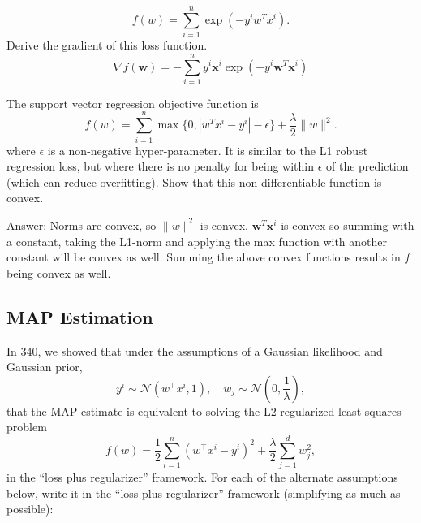 \documentclass{article}
\def\ans#1{\par\gre{Answer: #1}}
\def\blu#1{{\color{blu}#1}}
\def\gre#1{{\color{gre}#1}}
\def\norm#1{\|#1\|}
\begin{document}
{\[
f(w) = \sum_{i=1}^n \exp(-y^iw^Tx^i).
\]
\blu{Derive the gradient of this loss function.}
\\
\[\nabla f(\mathbf{w}) = -\sum_{i=1}^{n} y^i \mathbf{x}^i \exp{(-y^i \mathbf{w}^T \mathbf{x}^i)}\]
\item The support vector regression objective function is
\[
f(w) = \sum_{i=1}^n \max\{0, |w^Tx^i - y^i|-\epsilon\} + \frac \lambda 2 \norm{w}^2.
\]
where $\epsilon$ is a non-negative hyper-parameter. It is similar to the L1 robust regression loss, but where there is no penalty for being within $\epsilon$ of the prediction (which can reduce overfitting).\blu{ Show that this non-differentiable function is convex}.
\ans{
Norms are convex, so $\norm{w}^2$ is convex. 
$\mathbf{w}^T \mathbf{x}^i$ is convex so summing with a constant, taking the L1-norm and applying the max function with another constant will be convex as well.
Summing the above convex functions results in $f$ being convex as well.
}
}
\pagebreak



\subsection{MAP Estimation}


In 340, we showed that under the assumptions of a Gaussian likelihood and Gaussian prior,
\[
y^i \sim \mathcal{N}(w^\top x^i,1), \quad w_j \sim \mathcal{N}\left(0,\frac{1}{\lambda}\right),
\]
that the MAP estimate is equivalent to solving the L2-regularized least squares problem
\[
f(w) = \frac{1}{2}\sum_{i=1}^n (w^\top x^i - y^i)^2 + \frac \lambda 2 \sum_{j=1}^d w_j^2,
\]
in the ``loss plus regularizer'' framework.
For each of the alternate assumptions below, write it in the ``loss plus regularizer'' framework (simplifying as much as possible):
\end{document}
